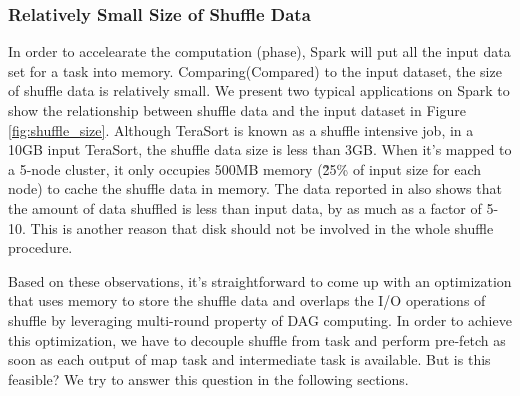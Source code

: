 \subsubsection{Relatively Small Size of Shuffle Data}\label{shufflesize}
In order to accelearate the computation (phase), Spark will put all the input data set for a task into memory. Comparing(Compared) to the input dataset, the size of shuffle data is relatively small. We present two typical applications on Spark to show the relationship between shuffle data and the input dataset in Figure \ref{fig:shuffle_size}. Although TeraSort\cite{terasort} is known as a shuffle intensive job, in a 10GB input TeraSort, the shuffle data size is less than 3GB. When it's mapped to a 5-node cluster, it only occupies 500MB memory (\~25\% of input size for each node) to cache the shuffle data in memory. The data reported in \cite{makingsense} also shows that the amount of data shuffled is less than input data, by as much as a factor of 5-10. This is another reason that disk should not be involved in the whole shuffle procedure.


Based on these observations, it's straightforward to come up with an optimization that uses memory to store the shuffle data and overlaps the I/O operations of shuffle by leveraging multi-round property of DAG computing. In order to achieve this optimization, we have to decouple shuffle from task and 
perform pre-fetch as soon as each output of map task and intermediate task is available. But is this feasible? We try to answer this question
in the following sections.
